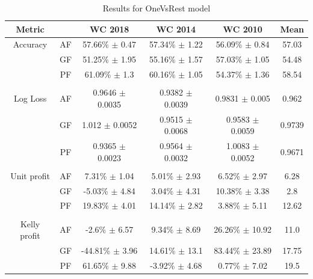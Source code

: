 \begin{table}
    \caption{Results for OneVsRest model}
    \begin{tabular}{| c  c| c| c| c|c|}
        \hline
        Metric& & \textbf{WC 2018} & \textbf{WC 2014} & \textbf{WC 2010} & Mean\\
        \hline
        Accuracy & AF & 57.66\% $\pm$ 0.47 & 57.34\% $\pm$ 1.22 & 56.09\% $\pm$ 0.84& 57.03 \\
         & GF & 51.25\% $\pm$ 1.95 & 55.16\% $\pm$ 1.57 & 57.03\% $\pm$ 1.05& 54.48 \\
         & PF & 61.09\% $\pm$ 1.3 & 60.16\% $\pm$ 1.05 & 54.37\% $\pm$ 1.36& 58.54 \\
         & & & & & \\
        Log Loss & AF & 0.9646 $\pm$ 0.0035 & 0.9382 $\pm$ 0.0039 & 0.9831 $\pm$ 0.005& 0.962 \\
         & GF & 1.012 $\pm$ 0.0052 & 0.9515 $\pm$ 0.0068 & 0.9583 $\pm$ 0.0059& 0.9739 \\
         & PF & 0.9365 $\pm$ 0.0023 & 0.9564 $\pm$ 0.0032 & 1.0083 $\pm$ 0.0052& 0.9671 \\
         & & & & & \\
        Unit profit & AF & 7.31\% $\pm$ 1.04 & 5.01\% $\pm$ 2.93 & 6.52\% $\pm$ 2.97& 6.28 \\
         & GF & -5.03\% $\pm$ 4.84 & 3.04\% $\pm$ 4.31 & 10.38\% $\pm$ 3.38& 2.8 \\
         & PF & 19.83\% $\pm$ 4.01 & 14.14\% $\pm$ 2.82 & 3.88\% $\pm$ 5.11& 12.62 \\
         & & & & &  \\
        Kelly profit & AF & -2.6\% $\pm$ 6.57 & 9.34\% $\pm$ 8.69 & 26.26\% $\pm$ 10.92& 11.0 \\
         & GF & -44.81\% $\pm$ 3.96 & 14.61\% $\pm$ 13.1 & 83.44\% $\pm$ 23.89& 17.75 \\
         & PF & 61.65\% $\pm$ 9.88 & -3.92\% $\pm$ 4.68 & 0.77\% $\pm$ 7.02& 19.5 \\
 \hline
    \end{tabular}
    \label{table:onevsrestresults}
\end{table}

